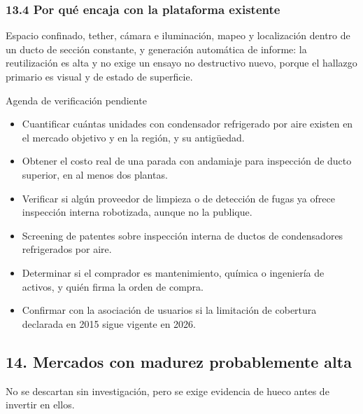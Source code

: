 \documentclass[11pt,a4paper]{article}
\newenvironment{detalle}[1]{\begin{detallebase}{#1}}{\end{detallebase}}
\begin{document}
\subsubsection*{13.4 Por qué encaja con la plataforma existente}

Espacio confinado, tether, cámara e iluminación, mapeo y localización dentro de un ducto de sección constante, y generación automática de informe: la reutilización es alta y no exige un ensayo no destructivo nuevo, porque el hallazgo primario es visual y de estado de superficie.

\begin{detalle}{Agenda de verificación pendiente}
\begin{itemize}
\item Cuantificar cuántas unidades con condensador refrigerado por aire existen en el mercado objetivo y en la región, y su antigüedad.
\item Obtener el costo real de una parada con andamiaje para inspección de ducto superior, en al menos dos plantas.
\item Verificar si algún proveedor de limpieza o de detección de fugas ya ofrece inspección interna robotizada, aunque no la publique.
\item Screening de patentes sobre inspección interna de ductos de condensadores refrigerados por aire.
\item Determinar si el comprador es mantenimiento, química o ingeniería de activos, y quién firma la orden de compra.
\item Confirmar con la asociación de usuarios si la limitación de cobertura declarada en 2015 sigue vigente en 2026.
\end{itemize}

\end{detalle}

\subsection*{14. Mercados con madurez probablemente alta}

No se descartan sin investigación, pero se exige evidencia de hueco antes de invertir en ellos.
\end{document}
